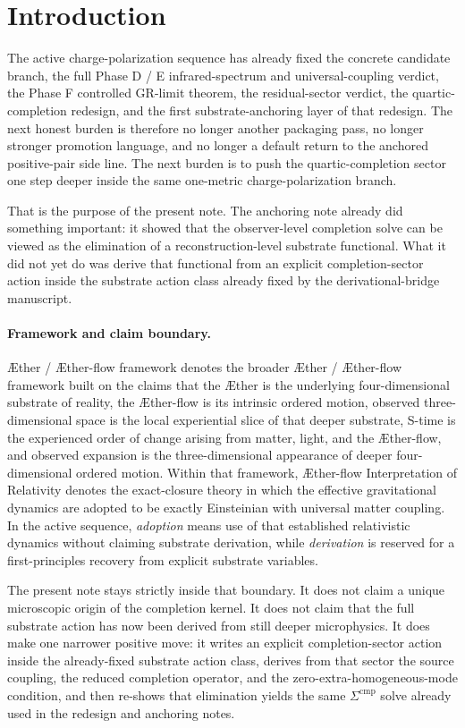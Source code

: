 \documentclass[11pt]{article}
\newcommand{\Aether}{\AE{}ther}
\newcommand{\Aflow}{\AE{}ther-flow}
\newcommand{\TheoryName}{\Aflow{} Interpretation of Relativity}
\newcommand{\TheoryProgram}{\Aether{} / \Aflow{} framework}
\newcommand{\CompShift}{\Sigma^{\mathrm{cmp}}}
\begin{document}
\section{Introduction}

The active charge-polarization sequence has already fixed the concrete candidate branch, the full Phase D / E infrared-spectrum and universal-coupling verdict, the Phase F controlled GR-limit theorem, the residual-sector verdict, the quartic-completion redesign, and the first substrate-anchoring layer of that redesign. The next honest burden is therefore no longer another packaging pass, no longer stronger promotion language, and no longer a default return to the anchored positive-pair side line. The next burden is to push the quartic-completion sector one step deeper inside the same one-metric charge-polarization branch.

That is the purpose of the present note. The anchoring note already did something important: it showed that the observer-level completion solve can be viewed as the elimination of a reconstruction-level substrate functional. What it did not yet do was derive that functional from an explicit completion-sector action inside the substrate action class already fixed by the derivational-bridge manuscript.

\paragraph{Framework and claim boundary.}
\TheoryProgram{} denotes the broader \Aether{} / \Aflow{} framework built on the claims that the \Aether{} is the underlying four-dimensional substrate of reality, the \Aflow{} is its intrinsic ordered motion, observed three-dimensional space is the local experiential slice of that deeper substrate, S-time is the experienced order of change arising from matter, light, and the \Aflow{}, and observed expansion is the three-dimensional appearance of deeper four-dimensional ordered motion. Within that framework, \TheoryName{} denotes the exact-closure theory in which the effective gravitational dynamics are adopted to be exactly Einsteinian with universal matter coupling. In the active sequence, \emph{adoption} means use of that established relativistic dynamics without claiming substrate derivation, while \emph{derivation} is reserved for a first-principles recovery from explicit substrate variables.

The present note stays strictly inside that boundary. It does not claim a unique microscopic origin of the completion kernel. It does not claim that the full substrate action has now been derived from still deeper microphysics. It does make one narrower positive move: it writes an explicit completion-sector action inside the already-fixed substrate action class, derives from that sector the source coupling, the reduced completion operator, and the zero-extra-homogeneous-mode condition, and then re-shows that elimination yields the same \(\CompShift\) solve already used in the redesign and anchoring notes.
\end{document}
